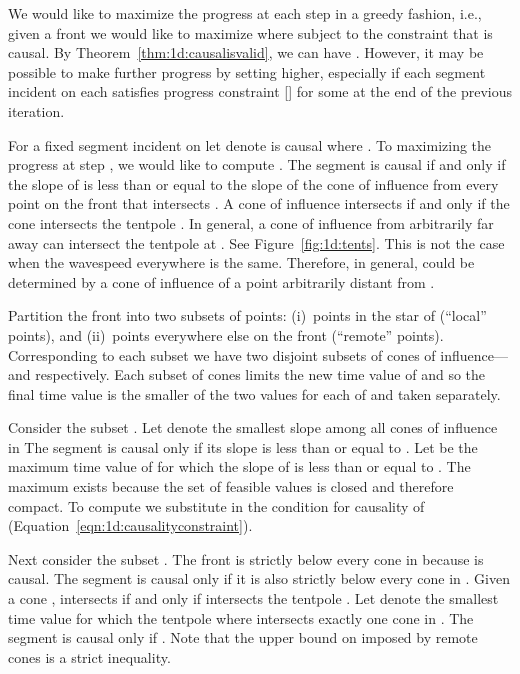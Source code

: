 \documentclass[twocolumn]{article}
\begin{document}
We would like to maximize the progress at each step in a greedy
fashion, i.e., given a front  we would like to maximize
 where  subject to the
constraint that  is causal.  By
Theorem~\ref{thm:1d:causalisvalid}, we can have .  However, it may be possible to make further progress by
setting  higher, especially if each segment  incident on
 each satisfies progress constraint [] for some
 at the end of the previous iteration.

For a fixed segment  incident on  let  denote
 is causal where .  To
maximizing the progress at step , we would like to compute
.  The segment  is causal if and only if the
slope of  is less than or equal to the slope of the cone of
influence from every point on the front that intersects .  A
cone of influence intersects  if and only if the cone
intersects the tentpole .  In general, a cone of influence
from arbitrarily far away can intersect the tentpole at . See
Figure~\ref{fig:1d:tents}.  This is not the case when the wavespeed
everywhere is the same.  Therefore, in general,  could be
determined by a cone of influence of a point arbitrarily distant from
.

Partition the front into two subsets of points: (i)~points in the star
of  (``local'' points), and (ii)~points everywhere else on the
front (``remote'' points).  Corresponding to each subset we have two
disjoint subsets of cones of influence---
and  respectively.  Each subset of cones
limits the new time value of  and so the final time value is the
smaller of the two values for each of  and
 taken separately.

Consider the subset .  Let
 denote the smallest slope among all cones of
influence in  The segment  is
causal only if its slope is less than or equal to .
Let  be the maximum time value of  for which
the slope of  is less than or equal to .
The maximum  exists because the set of feasible
values is closed and therefore compact.  To compute 
we substitute  in the condition for causality of
 (Equation~\ref{eqn:1d:causalityconstraint}).

Next consider the subset .  The front
 is strictly below every cone in 
because  is causal.  The segment  is causal only if it
is also strictly below every cone in .
Given a cone ,  intersects
 if and only if  intersects the tentpole .  Let
 denote the smallest time value  for which the
tentpole  where  intersects exactly one cone in
.    The segment  is causal only
if .  Note that the upper bound on  imposed
by remote cones is a strict inequality.
\end{document}
